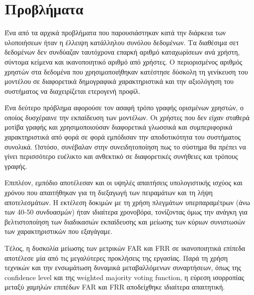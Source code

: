 \section{Προβλήματα}
Ένα από τα αρχικά προβλήματα που παρουσιάστηκαν κατά την διάρκεια των υλοποιήσεων ήταν η έλλειψη κατάλληλου συνόλου δεδομένων. Τα διαθέσιμα σετ δεδομένων δεν συνδύαζαν ταυτόχρονα επαρκή αριθμό καταχωρίσεων ανά χρήστη, σύντομα κείμενα και ικανοποιητικό αριθμό από χρήστες. Ο περιορισμένος αριθμός χρηστών στα δεδομένα που χρησιμοποιήθηκαν κατέστησε δύσκολη τη γενίκευση του μοντέλου σε διαφορετικά δημογραφικά χαρακτηριστικά και την αξιολόγηση του συστήματος να διαχειρίζεται ετερογενή προφίλ.

Ένα δεύτερο πρόβλημα αφορούσε τον ασαφή τρόπο γραφής ορισμένων χρηστών, ο οποίος δυσχέραινε την εκπαίδευση των μοντέλων. Οι χρήστες που δεν είχαν σταθερά μοτίβα γραφής και χρησιμοποιούσαν διαφορετικά γλωσσικά και συμπεριφορικά χαρακτηριστικά από φορά σε φορά εμπόδισαν την αποδοτικότητα του συστήματος συνολικά. Ωστόσο, συνέβαλαν στην συνειδητοποίηση πως το σύστημα θα πρέπει να γίνει περισσότερο ευέλικτο και ανθεκτικό σε διαφορετικές συνήθειες και τρόπους γραφής.

Επιπλέον, εμπόδιο αποτέλεσαν και οι υψηλές απαιτήσεις υπολογιστικής ισχύος και χρόνου που απαιτήθηκαν για τη διεξαγωγή των πειραμάτων και τη λήψη αποτελεσμάτων. Η εκτέλεση δοκιμών με τη χρήση πλεγμάτων υπερπαραμέτρων (άνω των 40-50 συνδυασμών) ήταν ιδιαίτερα χρονοβόρα, τονίζοντας όμως την ανάγκη για βελτιστοποίηση των διαδικασιών εκπαίδευσης και μείωσης των κύριων συνιστωσών των χαρακτηριστικών που εξαγάγαμε.

Τέλος, η δυσκολία μείωσης των μετρικών FAR και FRR σε ικανοποιητικά επίπεδα αποτέλεσε μία από τις μεγαλύτερες προκλήσεις της εργασίας. Παρά τη χρήση τεχνικών και την ενσωμάτωση δυναμικά μεταβαλλόμενων συναρτήσεων, όπως της confidence level και της weighted majority voting function, η εύρεση ισορροπίας μεταξύ χαμηλών επιπέδων FAR και FRR αποδείχθηκε ιδιαίτερα απαιτητική.
